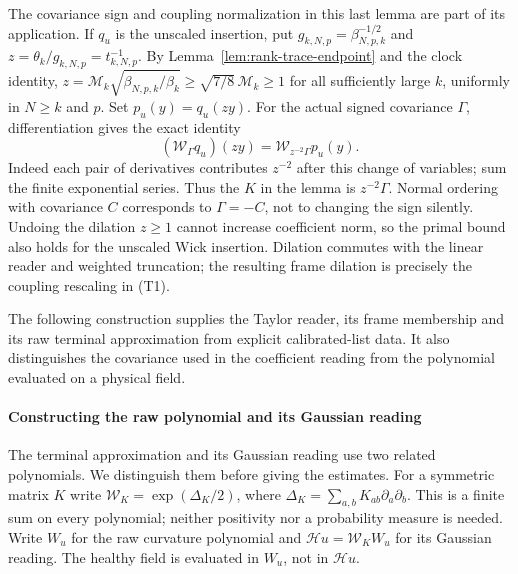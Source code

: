 The covariance sign and coupling normalization in this last lemma are
part of its application. If $q_u$ is the unscaled insertion, put
$g_{k,N,p}=\beta_{N,p,k}^{-1/2}$ and
$z=\theta_k/g_{k,N,p}=t_{k,N,p}^{-1}$. By
Lemma~\ref{lem:rank-trace-endpoint} and the clock identity,
$z=\mathcal M_k\sqrt{\beta_{N,p,k}/\widehat\beta_k}
\ge\sqrt{7/8}\,\mathcal M_k\ge1$ for all sufficiently large $k$,
uniformly in $N\ge k$ and $p$. Set $p_u(y)=q_u(zy)$. For the actual signed
covariance $\Gamma$, differentiation gives the exact identity
\[
 (\mathcal W_\Gamma q_u)(zy)
       =\mathcal W_{z^{-2}\Gamma}p_u(y).
\]
Indeed each pair of derivatives contributes $z^{-2}$ after this
change of variables; sum the finite exponential series. Thus the $K$
in the lemma is $z^{-2}\Gamma$. Normal ordering with covariance $C$
corresponds to $\Gamma=-C$, not to changing the sign silently.
Undoing the dilation $z\ge1$ cannot increase coefficient norm, so the
primal bound also holds for the unscaled Wick insertion. Dilation
commutes with the linear reader and weighted truncation; the resulting
frame dilation is precisely the coupling rescaling in (T1).

The following construction supplies the Taylor reader, its frame membership
and its raw terminal approximation from explicit calibrated-list data.
It also distinguishes the covariance used in the coefficient reading
from the polynomial evaluated on a physical field.

\paragraph*{Constructing the raw polynomial and its Gaussian reading}

The terminal approximation and its Gaussian reading use two related
polynomials. We distinguish them before giving the estimates. For a
symmetric matrix $K$ write $\mathcal W_K=\exp(\Delta_K/2)$, where
$\Delta_K=\sum_{a,b}K_{ab}\partial_a\partial_b$. This is a finite
sum on every polynomial; neither positivity nor a probability measure
is needed. Write $W_u$ for the raw curvature polynomial and
$\mathcal H u=\mathcal W_K W_u$ for its Gaussian reading. The healthy
field is evaluated in $W_u$, not in $\mathcal H u$.

